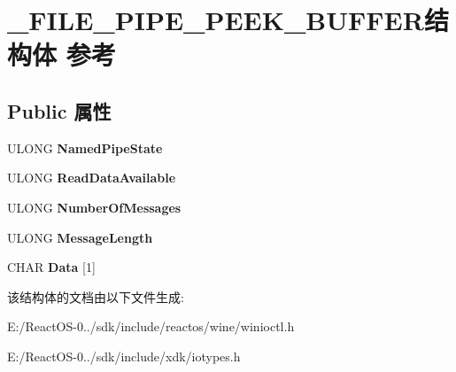 \hypertarget{struct___f_i_l_e___p_i_p_e___p_e_e_k___b_u_f_f_e_r}{}\section{\+\_\+\+F\+I\+L\+E\+\_\+\+P\+I\+P\+E\+\_\+\+P\+E\+E\+K\+\_\+\+B\+U\+F\+F\+E\+R结构体 参考}
\label{struct___f_i_l_e___p_i_p_e___p_e_e_k___b_u_f_f_e_r}
\subsection*{Public 属性}
\begin{DoxyCompactItemize}
\item 
\mbox{\label{struct___f_i_l_e___p_i_p_e___p_e_e_k___b_u_f_f_e_r_a8bdce6c07e2171487b691269b4dbbd8d}} 
U\+L\+O\+NG {\bfseries Named\+Pipe\+State}
\item 
\mbox{\label{struct___f_i_l_e___p_i_p_e___p_e_e_k___b_u_f_f_e_r_aaa10cb8e547ccafa0fe21c4ac606c79e}} 
U\+L\+O\+NG {\bfseries Read\+Data\+Available}
\item 
\mbox{\label{struct___f_i_l_e___p_i_p_e___p_e_e_k___b_u_f_f_e_r_a05854b3c0221f57610d4d29f0bf37a9b}} 
U\+L\+O\+NG {\bfseries Number\+Of\+Messages}
\item 
\mbox{\label{struct___f_i_l_e___p_i_p_e___p_e_e_k___b_u_f_f_e_r_a710e9f58b739908f8a5cfa55a534170b}} 
U\+L\+O\+NG {\bfseries Message\+Length}
\item 
\mbox{\label{struct___f_i_l_e___p_i_p_e___p_e_e_k___b_u_f_f_e_r_a0493e152e561a2af9d0a86a376e2b206}} 
C\+H\+AR {\bfseries Data} \mbox{[}1\mbox{]}
\end{DoxyCompactItemize}


该结构体的文档由以下文件生成\+:\begin{DoxyCompactItemize}
\item 
E\+:/\+React\+O\+S-\/0../sdk/include/reactos/wine/winioctl.\+h\item 
E\+:/\+React\+O\+S-\/0../sdk/include/xdk/iotypes.\+h\end{DoxyCompactItemize}
